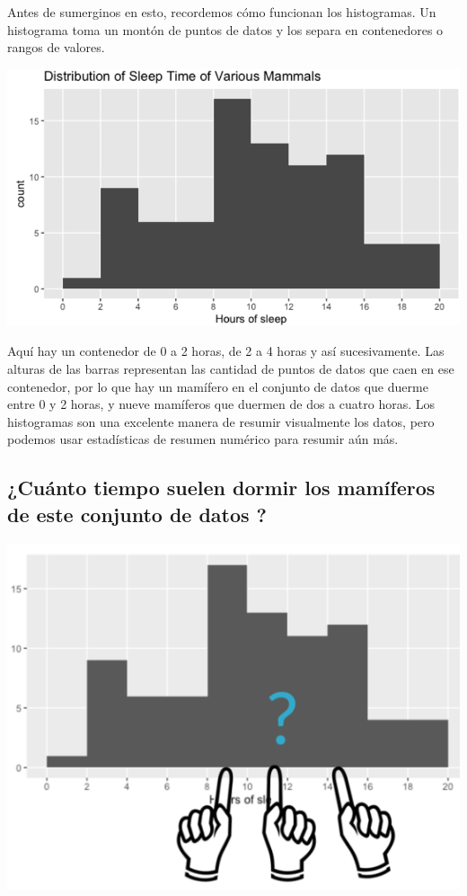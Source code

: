 \documentclass[
  letterpaper,
  DIV=11,
  numbers=noendperiod]{scrreprt}
\begin{document}
Antes de sumerginos en esto, recordemos cómo funcionan los histogramas.
Un histograma toma un montón de puntos de datos y los separa en
contenedores o rangos de valores.

\includegraphics{fig2.png}

Aquí hay un contenedor de 0 a 2 horas, de 2 a 4 horas y así
sucesivamente. Las alturas de las barras representan las cantidad de
puntos de datos que caen en ese contenedor, por lo que hay un mamífero
en el conjunto de datos que duerme entre 0 y 2 horas, y nueve mamíferos
que duermen de dos a cuatro horas. Los histogramas son una excelente
manera de resumir visualmente los datos, pero podemos usar estadísticas
de resumen numérico para resumir aún más.

\hypertarget{cuuxe1nto-tiempo-suelen-dormir-los-mamuxedferos-de-este-conjunto-de-datos}{%
\subsection{¿Cuánto tiempo suelen dormir los mamíferos de este conjunto
de datos
?}\label{cuuxe1nto-tiempo-suelen-dormir-los-mamuxedferos-de-este-conjunto-de-datos}}

\includegraphics{fig3.png}
\end{document}
